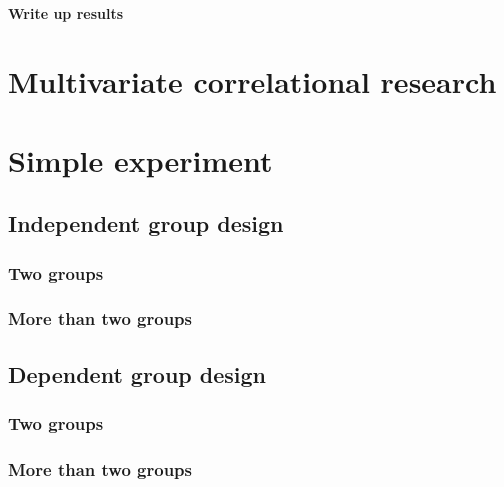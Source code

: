 \documentclass[
]{book}
\begin{document}
\hypertarget{write-up-results}{%
\subsubsection{Write up results}\label{write-up-results}}

\hypertarget{multivariate-correlational-research}{%
\chapter{Multivariate correlational research}\label{multivariate-correlational-research}}

\hypertarget{simple-experiment}{%
\chapter{Simple experiment}\label{simple-experiment}}

\hypertarget{independent-group-design}{%
\section{Independent group design}\label{independent-group-design}}

\hypertarget{two-groups}{%
\subsection{Two groups}\label{two-groups}}

\hypertarget{more-than-two-groups}{%
\subsection{More than two groups}\label{more-than-two-groups}}

\hypertarget{dependent-group-design}{%
\section{Dependent group design}\label{dependent-group-design}}

\hypertarget{two-groups-1}{%
\subsection{Two groups}\label{two-groups-1}}

\hypertarget{more-than-two-groups-1}{%
\subsection{More than two groups}\label{more-than-two-groups-1}}
\end{document}
